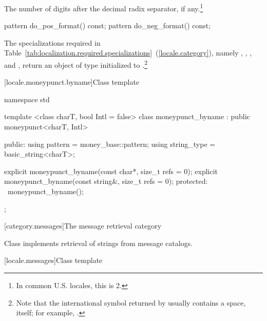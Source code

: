 \begin{itemdescr}
\pnum
\returns
The number of digits after the decimal radix separator, if any.\footnote{In
common U.S. locales, this is 2.}
\end{itemdescr}

%
%
%
%
\begin{itemdecl}
pattern do_pos_format() const;
pattern do_neg_format() const;
\end{itemdecl}

\begin{itemdescr}
\pnum
\returns
The specializations required in Table~\ref{tab:localization.required.specializations}~(\ref{locale.category}), namely
,
,
,
and
,
return an object of type
initialized to
.\footnote{Note that the international
symbol returned by
usually contains a space, itself;
for example, .}
\end{itemdescr}

[locale.moneypunct.byname]{Class template }

%
\begin{codeblock}
namespace std {
  template <class charT, bool Intl = false>
  class moneypunct_byname : public moneypunct<charT, Intl> {
  public:
    using pattern     = money_base::pattern;
    using string_type = basic_string<charT>;

    explicit moneypunct_byname(const char*, size_t refs = 0);
    explicit moneypunct_byname(const string&, size_t refs = 0);
  protected:
    ~moneypunct_byname();
  };
}
\end{codeblock}

[category.messages]{The message retrieval category}

\pnum
Class
implements retrieval of strings from message catalogs.

[locale.messages]{Class template }

